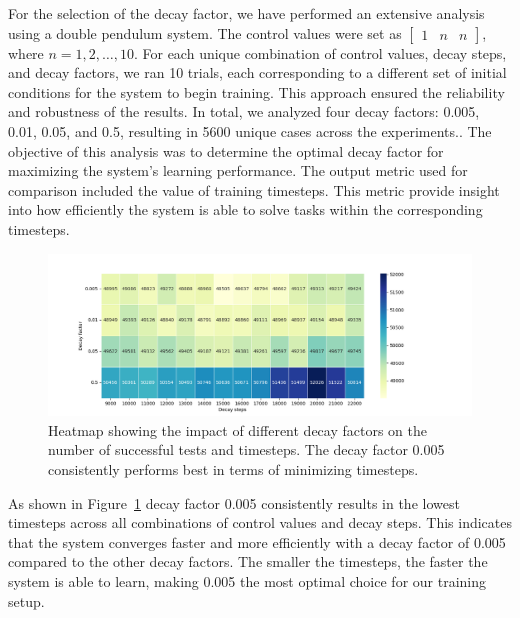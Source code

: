 For the selection of the decay factor, we have performed an extensive analysis using a double pendulum system. The control values were set as \(\begin{bmatrix} 1 & n & n \end{bmatrix}\), where \(n = 1, 2, \ldots, 10\). For each unique combination of control values, decay steps, and decay factors, we ran 10 trials, each corresponding to a different set of initial conditions for the system to begin training. This approach ensured the reliability and robustness of the results. In total, we analyzed four decay factors: 0.005, 0.01, 0.05, and 0.5, resulting in 5600 unique cases across the experiments.. The objective of this analysis was to determine the optimal decay factor for maximizing the system's learning performance.
The output metric used for comparison included the value of training timesteps. This metric provide insight into how efficiently the system is able to solve tasks within the corresponding timesteps.

\begin{figure}[h] 
	\centering 
	\includegraphics[width=15cm]{Figures/MaxSuccessfulTestsTimesteps_heatmap.png} 
	\caption{Heatmap showing the impact of different decay factors on the number of successful tests and timesteps. The decay factor 0.005 consistently performs best in terms of minimizing timesteps.} 
	\label{fig: decay factors comparison}
\end{figure}

As shown in Figure~\ref{fig: decay factors comparison} decay factor 0.005 consistently results in the lowest timesteps across all combinations of control values and decay steps. This indicates that the system converges faster and more efficiently with a decay factor of 0.005 compared to the other decay factors. The smaller the timesteps, the faster the system is able to learn, making 0.005 the most optimal choice for our training setup.

